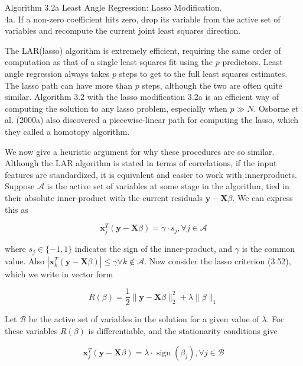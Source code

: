 \documentclass[10pt]{article}
\begin{document}
Algorithm 3.2a Least Angle Regression: Lasso Modification.\\
4a. If a non-zero coefficient hits zero, drop its variable from the active set of variables and recompute the current joint least squares direction.

The LAR(lasso) algorithm is extremely efficient, requiring the same order of computation as that of a single least squares fit using the $p$ predictors. Least angle regression always takes $p$ steps to get to the full least squares estimates. The lasso path can have more than $p$ steps, although the two are often quite similar. Algorithm 3.2 with the lasso modification 3.2a is an efficient way of computing the solution to any lasso problem, especially when $p \gg N$. Osborne et al. (2000a) also discovered a piecewise-linear path for computing the lasso, which they called a homotopy algorithm.

We now give a heuristic argument for why these procedures are so similar. Although the LAR algorithm is stated in terms of correlations, if the input features are standardized, it is equivalent and easier to work with innerproducts. Suppose $\mathcal{A}$ is the active set of variables at some stage in the algorithm, tied in their absolute inner-product with the current residuals $\mathbf{y}-\mathbf{X} \beta$. We can express this as


\begin{equation*}
\mathbf{x}_{j}^{T}(\mathbf{y}-\mathbf{X} \beta)=\gamma \cdot s_{j}, \forall j \in \mathcal{A} \tag{3.56}
\end{equation*}


where $s_{j} \in\{-1,1\}$ indicates the sign of the inner-product, and $\gamma$ is the common value. Also $\left|\mathbf{x}_{k}^{T}(\mathbf{y}-\mathbf{X} \beta)\right| \leq \gamma \forall k \notin \mathcal{A}$. Now consider the lasso criterion (3.52), which we write in vector form


\begin{equation*}
R(\beta)=\frac{1}{2}\|\mathbf{y}-\mathbf{X} \beta\|_{2}^{2}+\lambda\|\beta\|_{1} \tag{3.57}
\end{equation*}


Let $\mathcal{B}$ be the active set of variables in the solution for a given value of $\lambda$. For these variables $R(\beta)$ is differentiable, and the stationarity conditions give


\begin{equation*}
\mathbf{x}_{j}^{T}(\mathbf{y}-\mathbf{X} \beta)=\lambda \cdot \operatorname{sign}\left(\beta_{j}\right), \forall j \in \mathcal{B} \tag{3.58}
\end{equation*}
\end{document}
